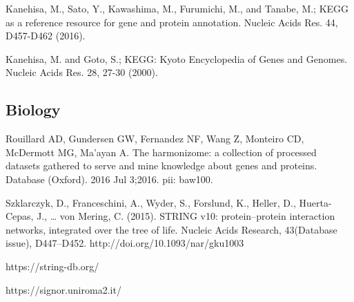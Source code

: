  Kanehisa, M., Sato, Y., Kawashima, M., Furumichi, M., and Tanabe, M.; 
\newblock KEGG as a reference resource for gene and protein annotation. 
\newblock Nucleic Acids Res. 44, D457-D462 (2016).

 Kanehisa, M. and Goto, S.; 
\newblock KEGG: Kyoto Encyclopedia of Genes and Genomes. 
\newblock Nucleic Acids Res. 28, 27-30 (2000). 

\subsection{Biology}

 Rouillard AD, Gundersen GW, Fernandez NF, Wang Z, Monteiro CD, McDermott MG, Ma'ayan A. 
\newblock The harmonizome: a collection of processed datasets gathered to serve and mine knowledge about genes and proteins. 
\newblock Database (Oxford). 2016 Jul 3;2016. pii: baw100.

Szklarczyk, D., Franceschini, A., Wyder, S., Forslund, K., Heller, D., Huerta-Cepas, J., … von Mering, C. (2015). 
\newblock STRING v10: protein–protein interaction networks, integrated over the tree of life. 
\newblock Nucleic Acids Research, 43(Database issue), D447–D452. http://doi.org/10.1093/nar/gku1003

 https://string-db.org/

https://signor.uniroma2.it/

